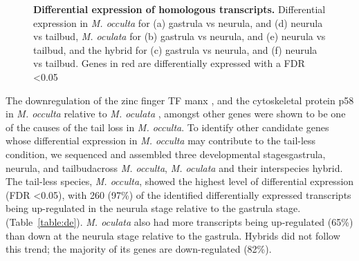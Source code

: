 \begin{figure}
{	}
	\caption{\textbf{Differential expression of homologous transcripts.} Differential expression in \textit{M. occulta} for (a) gastrula vs neurula, and (d) neurula vs tailbud, \textit{M. oculata} for (b) gastrula vs neurula, and (e) neurula vs tailbud, and the hybrid for (c) gastrula vs neurula, and (f) neurula vs tailbud. Genes in red are differentially expressed with a FDR \textless 0.05}
	\label{fig:de_plots}
\end{figure}

The downregulation of the zinc finger TF manx \cite{swalla_requirement_1996}, and the cytoskeletal protein p58  in \textit{M. occulta} relative to \textit{M. oculata} \cite{swalla_identification_1991}, amongst other genes were shown to be one of the causes of the tail loss in \textit{M. occulta}. To identify other candidate genes whose differential expression in \textit{M. occulta} may contribute to the tail-less condition, we sequenced and assembled three developmental stages\textemdash gastrula, neurula, and tailbud\textemdash across \textit{M. occulta}, \textit{M. oculata} and their interspecies hybrid. The tail-less species, \textit{M. occulta}, showed the highest level of differential expression (FDR \textless 0.05), with 260 (97\%) of the identified differentially expressed transcripts being up-regulated in the neurula stage relative to the gastrula stage. (Table~\ref{table:de}). \textit{M. oculata} also had more transcripts being up-regulated (65\%) than down at the neurula stage relative to the gastrula. Hybrids did not follow this trend; the majority of its genes are down-regulated (82\%).  

